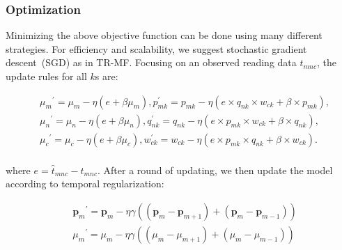 
\subsubsection{Optimization}
Minimizing the above objective function can be done using many different strategies.
For efficiency and scalability, we suggest stochastic gradient descent~(SGD) as in TR-MF.
Focusing on an observed reading data $t_{mnc} $, the update rules for all $k$s are:

{
\scriptsize
\begin{equation*}
\begin{aligned}
&{\mu_m}^\prime=\mu_m-\eta(e+\beta\mu_m), p_{mk}^\prime=p_{mk}-\eta(e\times q_{nk}\times w_{ck} + \beta \times p_{mk}), \\
&{\mu_n}^\prime=\mu_n-\eta(e+\beta\mu_n), q_{nk}^\prime=q_{nk}-\eta(e\times p_{mk}\times w_{ck} + \beta \times q_{nk}), \\
&{\mu_c}^\prime=\mu_c-\eta(e+\beta\mu_c), w_{ck}^\prime=w_{ck}-\eta(e\times p_{mk}\times q_{nk} + \beta \times w_{ck}). \\
\end{aligned}
\end{equation*}
}

where $e=\hat{t}_{mnc}-t_{mnc}$. After a round of updating, we then update the model according to temporal regularization:

{
\scriptsize
\begin{equation*}
\begin{aligned}
&{\mathbf{p}_m}^\prime={\mathbf{p}_m}-\eta\gamma((\mathbf{p}_m-\mathbf{p}_{m+1})+(\mathbf{p}_m-\mathbf{p}_{m-1}))
\\&{\mu_m}^\prime=\mu_m-\eta\gamma((\mu_m-\mu_{m+1})+(\mu_m-\mu_{m-1}))
\end{aligned}
\end{equation*}
}

